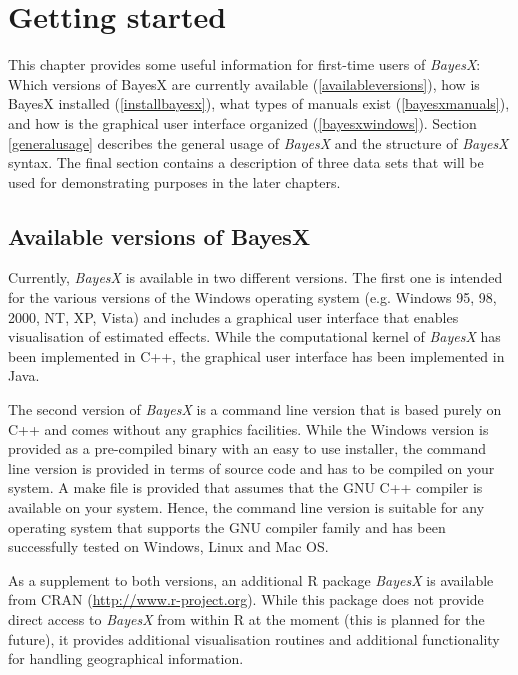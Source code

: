 \chapter{Getting started}
\label{gettingstarted}

This chapter provides some useful information for first-time users
of {\em BayesX}: Which versions of BayesX are currently available
(\autoref{availableversions}), how is BayesX installed
(\autoref{installbayesx}), what types of manuals exist
(\autoref{bayesxmanuals}), and how is the graphical user interface
organized (\autoref{bayesxwindows}). Section \ref{generalusage}
describes the general usage of {\em BayesX} and the structure of
{\em BayesX} syntax. The final section contains a description of
three data sets that will be used for demonstrating purposes in
the later chapters.

\section{Available versions of BayesX}
\label{availableversions}    

Currently, {\it BayesX} is available in two different versions. The first one is intended for the various versions of the
Windows operating system (e.g. Windows 95, 98, 2000, NT, XP, Vista) and includes a graphical user interface that enables
visualisation of estimated effects. While the computational kernel of {\it BayesX} has been implemented in C++, the graphical
user interface has been implemented in Java.

The second version of {\it BayesX} is a command line version that is based purely on C++ and comes without any graphics
facilities. While the Windows version is provided as a pre-compiled binary with an easy to use installer, the command line
version is provided in terms of source code and has to be compiled on your system. A make file is provided that assumes that
the GNU C++ compiler is available on your system. Hence, the command line version is suitable for any operating system that
supports the GNU compiler family and has been successfully tested on Windows, Linux and Mac OS.

As a supplement to both versions, an additional R package {\it BayesX} is available from CRAN
(\href{http://www.r-project.org}{http://www.r-project.org}). While this package does not provide direct access to {\it BayesX}
from within R at the moment (this is planned for the future), it provides additional visualisation routines and additional
functionality for handling geographical information.

